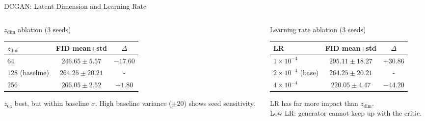 \documentclass[aspectratio=169,10pt]{beamer}
\begin{document}
\begin{frame}[shrink=5]{DCGAN: Latent Dimension and Learning Rate}
  \begin{columns}[T]
    \begin{column}{0.48\textwidth}
      \begin{block}{$z_\text{dim}$ ablation (3 seeds)}
        \centering\vspace{3pt}
        \begin{tabular}{lcc}
          \toprule
          $z_\text{dim}$ & FID mean$\pm$std & $\Delta$ \\
          \midrule
          64  & $246.65 \pm 5.57$  & $-17.60$ \\
          128 (baseline) & $264.25 \pm 20.21$ & - \\
          256 & $266.05 \pm 2.52$  & $+1.80$ \\
          \bottomrule
        \end{tabular}\vspace{3pt}
      \end{block}
      \vspace{3pt}
      $z_{64}$ best, but within baseline $\sigma$. High baseline variance ($\pm20$) shows seed sensitivity.
    \end{column}
    \begin{column}{0.48\textwidth}
      \begin{block}{Learning rate ablation (3 seeds)}
        \centering\vspace{3pt}
        \begin{tabular}{lcc}
          \toprule
          LR & FID mean$\pm$std & $\Delta$ \\
          \midrule
          $1\times10^{-4}$ & $295.11 \pm 18.27$ & $+30.86$ \\
          $2\times10^{-4}$ (base) & $264.25 \pm 20.21$ & - \\
          \textbf{$4\times10^{-4}$} & $\mathbf{220.05 \pm 4.47}$ & $-44.20$ \\
          \bottomrule
        \end{tabular}\vspace{3pt}
      \end{block}
      \vspace{3pt}
      LR has far more impact than $z_\text{dim}$.\\
      Low LR: generator cannot keep up with the critic.
    \end{column}
  \end{columns}
\end{frame}
\end{document}
